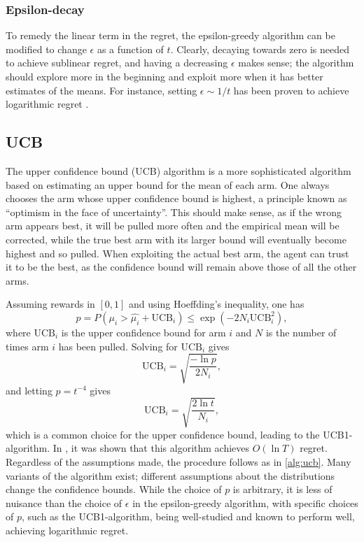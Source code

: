 \subsubsection{Epsilon-decay}
To remedy the linear term in the regret, the epsilon-greedy algorithm can be modified to change $\epsilon$ as a function of $t$.
Clearly, decaying towards zero is needed to achieve sublinear regret, and having a decreasing $\epsilon$ makes sense; the algorithm should explore more in the beginning and exploit more when it has better estimates of the means.
For instance, setting $\epsilon \sim 1/t$ has been proven to achieve logarithmic regret \cite{auer2002}.

\subsection{UCB}
The upper confidence bound (UCB) algorithm is a more sophisticated algorithm based on estimating an upper bound for the mean of each arm.
One always chooses the arm whose upper confidence bound is highest, a principle known as \enquote{optimism in the face of uncertainty}.
This should make sense, as if the wrong arm appears best, it will be pulled more often and the empirical mean will be corrected, while the true best arm with its larger bound will eventually become highest and so pulled.
When exploiting the actual best arm, the agent can trust it to be the best, as the confidence bound will remain above those of all the other arms.

Assuming rewards in $[0,1]$ and using Hoeffding's inequality, one has
\begin{equation}
    p
    = P \left(\mu_i > \hat{\mu_i} + \text{UCB}_i \right)
    \leq \exp \left(-2N_i \text{UCB}_i^2 \right),
\end{equation}
where $\text{UCB}_i$ is the upper confidence bound for arm $i$ and $N$ is the number of times arm $i$ has been pulled.
Solving for $\text{UCB}_i$ gives
\begin{equation}
    \text{UCB}_i = \sqrt{\frac{-\ln p}{2N_i}},
\end{equation}
and letting $p = t^{-4}$ gives
\begin{equation}
    \text{UCB}_i = \sqrt{\frac{2 \ln t}{N_i}},
\end{equation}
which is a common choice for the upper confidence bound, leading to the UCB1-algorithm.
In \cite{auer2002}, it was shown that this algorithm achieves $O(\ln T)$ regret.
Regardless of the assumptions made, the procedure follows as in \cref{alg:ucb}.
Many variants of the algorithm exist; different assumptions about the distributions change the confidence bounds.
While the choice of $p$ is arbitrary, it is less of nuisance than the choice of $\epsilon$ in the epsilon-greedy algorithm, with specific choices of $p$, such as the UCB1-algorithm, being well-studied and known to perform well, achieving logarithmic regret.

